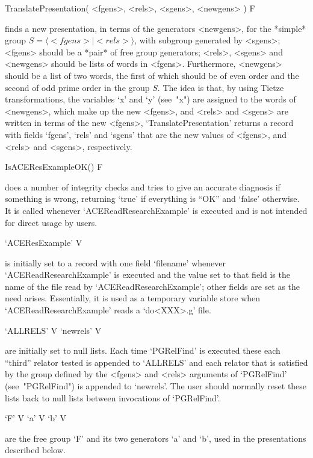 \>TranslatePresentation( <fgens>, <rels>, <sgens>, <newgens> ) F

finds a new presentation, in terms of the  generators  <newgens>,  for
the *simple* group $S = \langle <fgens>  \mid  <rels>  \rangle$,  with
subgroup generated by <sgens>; <fgens> should  be  a  *pair*  of  free
group generators; <rels>, <sgens> and <newgens>  should  be  lists  of
words in <fgens>. Furthermore, <newgens>  should  be  a  list  of  two
words, the first of which should be of even order and  the  second  of
odd prime order in the group $S$. The idea is that,  by  using  Tietze
transformations, the variables `x' and `y' (see~"x") are  assigned  to
the words of <newgens>, which make up the new <fgens>, and <rels>  and
<sgens>   are   written    in    terms    of    the    new    <fgens>,
`TranslatePresentation' returns a record with fields  `fgens',  `rels'
and `sgens' that are  the  new  values  of  <fgens>,  and  <rels>  and
<sgens>, respectively.

\>IsACEResExampleOK() F

does a number of integrity  checks  and  tries  to  give  an  accurate
diagnosis if something is wrong, returning  `true'  if  everything  is
``OK''   and   `false'    otherwise.    It    is    called    whenever
`ACEReadResearchExample' is executed and is not  intended  for  direct
usage by users.

\>`ACEResExample' V

is initially set to  a  record  with  one  field  `filename'  whenever
`ACEReadResearchExample' is executed and the value set to  that  field
is the name of the file read by `ACEReadResearchExample'; other fields
are set as the need arises. Essentially, it is  used  as  a  temporary
variable store when `ACEReadResearchExample' reads a `do<XXX>.g' file.

\>`ALLRELS' V
\>`newrels' V

are initially set to null lists. Each  time  `PGRelFind'  is  executed
these each ``third'' relator tested is appended to `ALLRELS' and  each
relator that is satisfied by the group  defined  by  the  <fgens>  and
<rels> arguments  of  `PGRelFind'  (see~"PGRelFind")  is  appended  to
`newrels'. The user should normally reset these  lists  back  to  null
lists between invocations of `PGRelFind'.

\>`F' V
\>`a' V
\>`b' V

are the free group `F' and its two generators `a' and `b', used in the
presentations described below.

